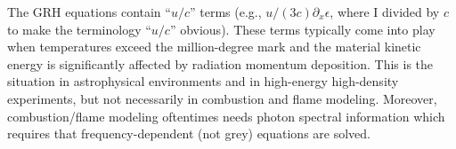 \documentclass{article}
\newcommand{\grad}{\vec{\nabla}}
\newcommand{\tcr}[1]{\textcolor{red}{#1}}
\begin{document}
The GRH equations contain ``$u/c$'' terms (e.g., $u/(3c) \partial_x \epsilon$, where I divided by $c$ to make the terminology ``$u/c$'' obvious). 
These terms typically come into play when temperatures exceed the million-degree mark and the material kinetic energy is significantly affected 
by radiation momentum deposition. This is the situation in astrophysical environments and in high-energy high-density experiments, but not necessarily 
in combustion and flame modeling. Moreover, combustion/flame modeling oftentimes needs photon spectral information which requires that frequency-dependent (not grey) 
equations are solved.


\end{document}
